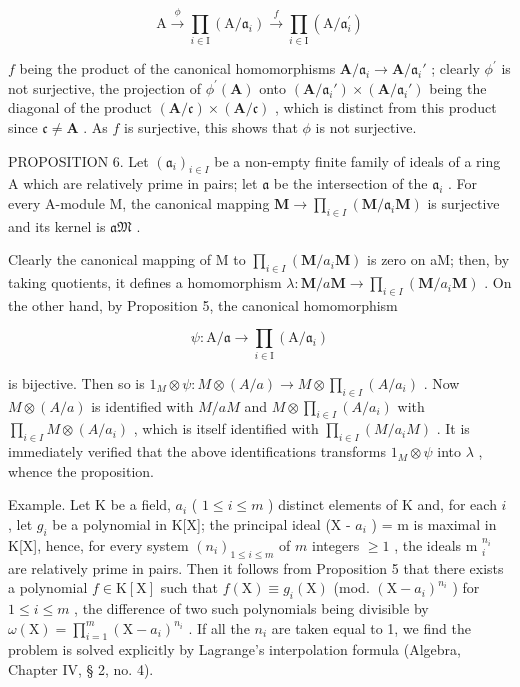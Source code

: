 \[
\mathrm{A} \xrightarrow {\phi} \prod_ {i \in \mathrm{I}} (\mathrm{A} / \mathfrak {a} _ {i}) \xrightarrow {f} \prod_ {i \in \mathrm{I}} (\mathrm{A} / \mathfrak {a} _ {i} ^ {\prime})
\]

\(f\) being the product of the canonical homomorphisms \(\mathbf{A} / \mathfrak{a}_i\to \mathbf{A} / \mathfrak{a}_i'\) ; clearly \(\phi^{\prime}\) is not surjective, the projection of \(\phi^{\prime}(\mathbf{A})\) onto \((\mathbf{A} / \mathfrak{a}_i')\times (\mathbf{A} / \mathfrak{a}_i')\) being the diagonal of the product \((\mathbf{A} / \mathfrak{c})\times (\mathbf{A} / \mathfrak{c})\) , which is distinct from this product since \(\mathfrak{c}\neq \mathbf{A}\) . As \(f\) is surjective, this shows that \(\phi\) is not surjective.

PROPOSITION 6. Let \((\mathfrak{a}_i)_{i\in I}\) be a non-empty finite family of ideals of a ring A which are relatively prime in pairs; let \(\mathfrak{a}\) be the intersection of the \(\mathfrak{a}_i\) . For every A-module M, the canonical mapping \(\mathbf{M} \to \prod_{i\in I} (\mathbf{M} / \mathfrak{a}_i\mathbf{M})\) is surjective and its kernel is \(\mathfrak{aM}\) .

Clearly the canonical mapping of M to \(\prod_{i\in I}(\mathbf{M} / a_i\mathbf{M})\) is zero on aM; then, by taking quotients, it defines a homomorphism \(\lambda : \mathbf{M} / a\mathbf{M}\to \prod_{i\in I}(\mathbf{M} / a_i\mathbf{M})\) . On the other hand, by Proposition 5, the canonical homomorphism

\[
\psi \colon \mathrm{A} / \mathfrak {a} \rightarrow \prod_ {i \in \mathrm{I}} (\mathrm{A} / \mathfrak {a} _ {i})
\]

is bijective. Then so is \(1_{M} \otimes \psi: M \otimes (A/a) \to M \otimes \prod_{i \in I} (A/a_i)\) . Now \(M \otimes (A/a)\) is identified with \(M/aM\) and \(M \otimes \prod_{i \in I} (A/a_i)\) with \(\prod_{i \in I} M \otimes (A/a_i)\) , which is itself identified with \(\prod_{i \in I} (M/a_iM)\) . It is immediately verified that the above identifications transforms \(1_M \otimes \psi\) into \(\lambda\) , whence the proposition.

Example. Let K be a field, \(a_{i}\) ( \(1 \leqslant i \leqslant m\) ) distinct elements of K and, for each \(i\) , let \(g_{i}\) be a polynomial in K{[}X{]}; the principal ideal (X - \(a_{i}\) ) = m is maximal in K{[}X{]}, hence, for every system \((n_{i})_{1 \leqslant i \leqslant m}\) of \(m\) integers \(\geqslant 1\) , the ideals m \(_{i}^{n_{i}}\) are relatively prime in pairs. Then it follows from Proposition 5 that there exists a polynomial \(f \in \mathrm{K}[\mathrm{X}]\) such that \(f(\mathrm{X}) \equiv g_{i}(\mathrm{X})\) (mod. \((\mathrm{X} - a_{i})^{n_{i}}\) ) for \(1 \leqslant i \leqslant m\) , the difference of two such polynomials being divisible by \(\omega(\mathrm{X}) = \prod_{i=1}^{m} (\mathrm{X} - a_{i})^{n_{i}}\) . If all the \(n_{i}\) are taken equal to 1, we find the problem is solved explicitly by Lagrange's interpolation formula (Algebra, Chapter IV, § 2, no. 4).

